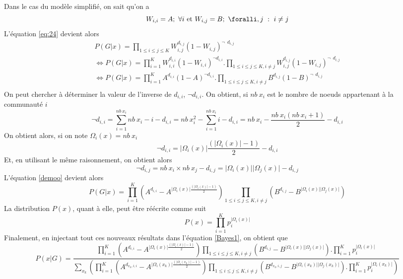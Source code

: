 \documentclass[a4paper, 11pt]{article}
\begin{document}
\begin{enumerate}
    Dans le cas du modèle simplifié, on sait qu'on a
    $$ W_{i,i}=A;~\forall i \mbox{ et } W_{i,j}=B;~\foralli,j~:~i\ne j$$
    L'équation \ref{eq:24} devient alors
    \begin{equation}
        \begin{split}
            P(G|x)=\prod_{1\le i \le j \le K} W_{i,j}^{d_{i,j}} (1-W_{i,j})^{\lnot ~
        ~d_{i,j}}\\
        \Longleftrightarrow P(G|x)=\prod^K_{i=1} W_{i,i}^{d_{i,i} }(1-W_{i,i})^{\lnot d_{i,i}} . \prod_{1\le i \le j \le K, i\ne j} W_{i,j}^{d_{i,j}} (1-W_{i,j})^{\lnot ~
        ~d_{i,j}}\\
        \Longleftrightarrow P(G|x)=\prod^K_{i=1} A^{d_{i,i} }(1-A)^{\lnot d_{i,i}} . \prod_{1\le i \le j \le K, i\ne j} B^{d_{i,j}} (1-B)^{\lnot ~
        ~d_{i,j}}\\
        \end{split}
        \label{demoo}
    \end{equation}
    On peut chercher à déterminer la valeur de l'inverse de $d_{i,i}$, $\lnot d_{i,i}$. On obtient, si $nb~x_i$ est le nombre de noeuds appartenant à la communauté $i$
    $$\lnot d_{i,i}=\sum^{nb~x_i}_{i=1} nb~x_i-i-d_{i,i}= nb~x_i^2-\sum_{i=1}^{nb~x_i} i-d_{i,i}=nb~x_i- \frac{nb~x_i (nb~x_i+1)}{2}-d_{i,i}$$
    On obtient alors, si on note $\Omega_i (x)= nb~x_i$
    \begin{equation}
        \lnot d_{i,i}=\lvert \Omega_i(x)\rvert \frac{(\lvert \Omega_i(x) \rvert -1)}{2}-d_{i,i}
    \end{equation}
    Et, en utilisant le même raisonnement, on obtient alors
    \begin{equation}
        \lnot d_{i,j}=nb~x_i \times nb~x_j -d_{i,j}=\lvert \Omega_i(x)\rvert \lvert \Omega_j (x) \rvert -d_{i,j}
    \end{equation}
    L'équation \ref{demoo} devient alors
    \begin{equation}
        P(G|x)=\prod^K_{i=1} (A^{d_{i,i}}-A^{\lvert \Omega_i(x)\rvert \frac{(\lvert \Omega_i(x) \rvert -1)}{2}}) \prod_{1\le i \le j \le K, i\ne j} (B^{d_{i,j}}-B^{\lvert \Omega_i(x)\rvert \lvert \Omega_j (x) \rvert})
    \end{equation}
    La distribution $P(x)$, quant à elle, peut être réécrite comme suit
    \begin{equation}
        P(x)=\prod^K_{i=1} p_i^{\lvert \Omega_i(x) \rvert}
    \end{equation}
    Finalement, en injectant tout ces nouveaux résultats dans l'équation \ref{Bayes1}, on obtient que
    \begin{equation}
        P(x|G)=\frac{\prod^K_{i=1} (A^{d_{i,i}}-A^{\lvert \Omega_i(x)\rvert \frac{(\lvert \Omega_i(x) \rvert -1)}{2}}) \prod_{1\le i \le j \le K, i\ne j} (B^{d_{i,j}}-B^{\lvert \Omega_i(x)\rvert \lvert \Omega_j (x) \rvert}). \prod^K_{i=1} p_i^{\lvert \Omega_i(x) \rvert}}{\sum_{x_k} (\prod^K_{i=1} (A^{d_{x_k,i,i}}-A^{\lvert \Omega_i(x_k)\rvert \frac{(\lvert \Omega_i(x_k) \rvert -1)}{2}}) \prod_{1\le i \le j \le K, i\ne j} (B^{d_{x_k,i,j}}-B^{\lvert \Omega_i(x_k)\rvert \lvert \Omega_j (x_k) \rvert}). \prod^K_{i=1} p_i^{\lvert \Omega_i(x_k) \rvert})}
        

\end{equation}
\end{enumerate}
\end{document}
